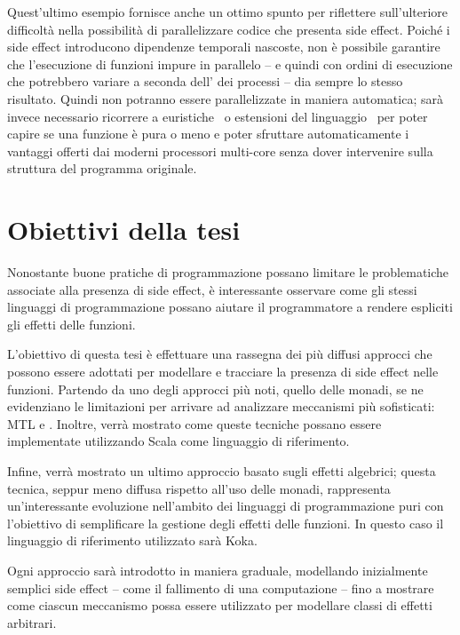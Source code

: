 


Quest'ultimo esempio fornisce anche un ottimo spunto per riflettere sull'ulteriore difficoltà nella possibilità di parallelizzare codice che presenta side effect.
Poiché i side effect introducono dipendenze temporali nascoste, non è possibile garantire che l'esecuzione di funzioni impure in parallelo -- e quindi con ordini di esecuzione che potrebbero variare a seconda dell' dei processi -- dia sempre lo stesso risultato.
Quindi non potranno essere parallelizzate in maniera automatica; sarà invece necessario ricorrere a euristiche~\cite{cit:safe-automated-refactoring-for-intelligent-parallelization-of-java-8-streams} o estensioni del linguaggio~\cite{cit:pure-functions-in-c-a-small-keyword-for-automatic-parallelization} per poter capire se una funzione è pura o meno e poter sfruttare automaticamente i vantaggi offerti dai moderni processori multi-core senza dover intervenire sulla struttura del programma originale.

\section*{Obiettivi della tesi}
Nonostante buone pratiche di programmazione possano limitare le problematiche associate alla presenza di side effect, è interessante osservare come gli stessi linguaggi di programmazione possano aiutare il programmatore a rendere espliciti gli effetti delle funzioni.

L'obiettivo di questa tesi è effettuare una rassegna dei più diffusi approcci che possono essere adottati per modellare e tracciare la presenza di side effect nelle funzioni.
Partendo da uno degli approcci più noti, quello delle monadi, se ne evidenziano le limitazioni per arrivare ad analizzare meccanismi più sofisticati: \ac{MTL} e .
Inoltre, verrà mostrato come queste tecniche possano essere implementate utilizzando Scala come linguaggio di riferimento.

Infine, verrà mostrato un ultimo approccio basato sugli effetti algebrici; questa tecnica, seppur meno diffusa rispetto all'uso delle monadi, rappresenta un'interessante evoluzione nell'ambito dei linguaggi di programmazione puri con l'obiettivo di semplificare la gestione degli effetti delle funzioni.
In questo caso il linguaggio di riferimento utilizzato sarà Koka.

Ogni approccio sarà introdotto in maniera graduale, modellando inizialmente semplici side effect -- come il fallimento di una computazione -- fino a mostrare come ciascun meccanismo possa essere utilizzato per modellare classi di effetti arbitrari.
